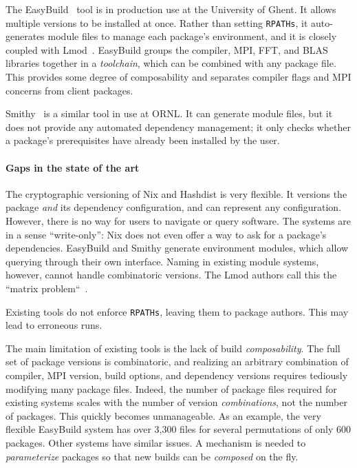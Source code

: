 The EasyBuild~\cite{hoste+:pyhpc12} tool is in production use at
the University of Ghent.  It allows multiple versions to be installed
at once.  Rather than setting {\tt RPATHs}, it auto-generates module files
to manage each package's environment, and it is closely coupled with 
Lmod~\cite{geimer+:hust14}.  EasyBuild groups the compiler, MPI, FFT, and
BLAS libraries together in a {\it toolchain}, which can be combined with
any package file. This provides some degree of composability and
separates compiler flags and MPI concerns from client packages.

Smithy~\cite{digirolamo:smithy} is a similar tool in use at ORNL. It
can generate module files, but it does not provide any 
automated dependency management; it only checks whether a package's
prerequisites have already been installed by the user.

\paragraph{Gaps in the state of the art}
The cryptographic versioning of Nix and Hashdist is very flexible.  It versions
the package {\it and} its dependency configuration, and can represent any
configuration. However, there is no way for users to navigate or query
software. The systems are in a sense ``write-only'':
Nix does not even offer a way to ask for a package's dependencies.
%
EasyBuild and Smithy generate environment modules, which allow querying
through their own interface. Naming in existing module systems, however, cannot
handle combinatoric versions. The Lmod authors call this the
``matrix problem``~\cite{mclay:lmod-tutorial}.


Existing tools do not enforce {\tt RPATHs}, leaving them to package authors.
This may lead to erroneous runs.

The main limitation of existing tools is the lack of build {\it composability}.
The full set of package versions is combinatoric, and realizing an arbitrary
combination of compiler, MPI version, build options, and dependency versions
requires tediously modifying many package files.
%
Indeed, the number of package files required for existing systems scales with
the number of version {\it combinations}, not the number of packages.
This quickly becomes unmanageable.  As an example, the very flexible EasyBuild
system has over 3,300 files for several permutations of only 600 packages. 
Other systems have similar issues. A mechanism is needed to {\it parameterize}
packages so that new builds can be {\it composed} on the fly.











